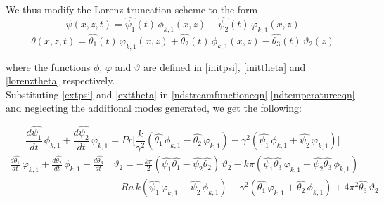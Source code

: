 \documentclass[paper=a4, fontsize=11pt]{scrartcl}
\numberwithin{equation}{section}		%
\numberwithin{figure}{section}			%
\numberwithin{table}{section}				%
\begin{document}
\noindent We thus modify the Lorenz truncation scheme to the form 
\begin{equation}
	\psi(x,z,t) = \hat{\psi_1}(t) \, \phi_{k,1}(x,z) + \hat{\psi_2}(t) \, \varphi_{k,1}(x,z)
	\label{extpsi}
\end{equation}
\begin{equation}
	\theta(x,z,t) = \hat{\theta_1}(t) \, \varphi_{k,1}(x,z) + \hat{\theta_2}(t) \, \phi_{k,1}(x,z) - \hat{\theta_3}(t) \, \vartheta_2 (z)
	\label{exttheta}
\end{equation}

\noindent where the functions $\phi$, $\varphi$ and $\vartheta$ are defined in \ref{initpsi}, \ref{inittheta} and \ref{lorenztheta} respectively.\\

\noindent Substituting \ref{extpsi} and \ref{exttheta} in \ref{ndstreamfunctioneqn}-\ref{ndtemperatureeqn} and neglecting the additional modes generated, we get the following:

\begin{equation}
	\frac{d \hat{\psi_1}}{dt} \, \phi_{k,1} + \frac{d \hat{\psi_2}}{dt} \, \varphi_{k,1} = Pr \biggl[ \frac{k}{\gamma^2} (\hat{\theta_1} \, \phi_{k,1} - \hat{\theta_2} \, \varphi_{k,1}) - \gamma^2 (\hat{\psi_1} \, \phi_{k,1} + \hat{\psi_2} \, \varphi_{k,1})\biggr]
	\label{extpsieqn}
\end{equation}
\begin{equation}
	\begin{split}
		\frac{d \hat{\theta_1}}{dt} \, \varphi_{k,1} + \frac{d \hat{\theta_2}}{dt} \, \phi_{k,1} - \frac{d \hat{\theta_3}}{dt} \, & \vartheta_2 
		=  - \frac{k \pi}{2} (\hat{\psi_1} \hat{\theta_1} - \hat{\psi_2} \hat{\theta_2}) \, \vartheta_2 - k \pi (\hat{\psi_1} \hat{\theta_3} \, \varphi_{k,1} - \hat{\psi_2} \hat{\theta_3} \, \phi_{k,1}) \\ 
		& + Ra \, k (\hat{\psi_1} \, \varphi_{k,1} - \hat{\psi_2} \, \phi_{k,1}) - \gamma^2 (\hat{\theta_1} \, \varphi_{k,1} + \hat{\theta_2} \, \phi_{k,1}) 
		 + 4 \pi^2 \hat{\theta_3} \, \vartheta_2
	\end{split}
	\label{extthetaeqn}
\end{equation}
\end{document}
